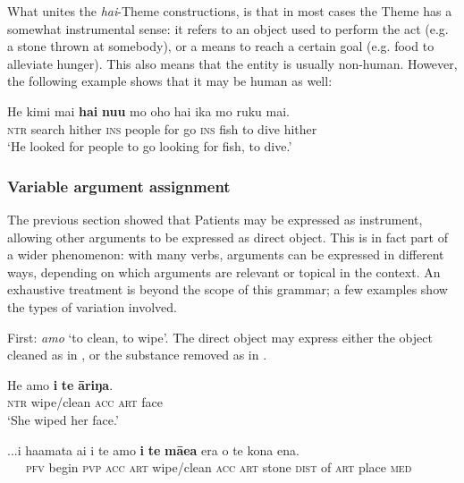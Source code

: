 What unites the \textit{hai}{}-Theme constructions, is that in most cases the Theme has a somewhat instrumental sense: it refers to an object used to perform the act (e.g. a stone thrown at somebody), or a means to reach a certain goal (e.g. food to alleviate hunger). This also means that the entity is usually non-human. However, the following example shows that it may be human as well:

\ea\label{ex:8.140}
\gll He kimi mai \textbf{hai} \textbf{nu{\ꞌ}u} mo oho hai ika mo ruku mai. \\
\textsc{ntr} search hither \textsc{ins} people for go \textsc{ins} fish to dive hither \\

\glt 
‘He looked for people to go looking for fish, to dive.’ \textstyleExampleref{[R309.100]} 
\z
{}
\subsubsection{Variable argument assignment}\label{sec:8.6.4.4}

The previous section showed that Patients may be expressed as instrument, allowing other arguments to be expressed as direct object. This is in fact part of a wider phenomenon: with many verbs, arguments can be expressed in different ways, depending on which arguments are relevant or topical in the context. An exhaustive treatment is beyond the scope of this grammar; a few examples show the types of variation involved.

First: \textit{amo} ‘to clean, to wipe’. The direct object may express either the object cleaned as in , or the substance removed as in .

\ea\label{ex:8.141}
\gll He amo \textbf{i} \textbf{te} \textbf{{\ꞌ}āriŋa}. \\
\textsc{ntr} wipe/clean \textsc{acc} \textsc{art} face \\

\glt 
‘She wiped her face.’ \textstyleExampleref{[Ley-9-55.030]}
\z

\ea\label{ex:8.142}
\gll ...i ha{\ꞌ}amata ai i te amo \textbf{i} \textbf{te} \textbf{mā{\ꞌ}ea} era o te kona ena. \\
~~~\textsc{pfv} begin \textsc{pvp} \textsc{acc} \textsc{art} wipe/clean \textsc{acc} \textsc{art} stone \textsc{dist} of \textsc{art} place \textsc{med} \\

